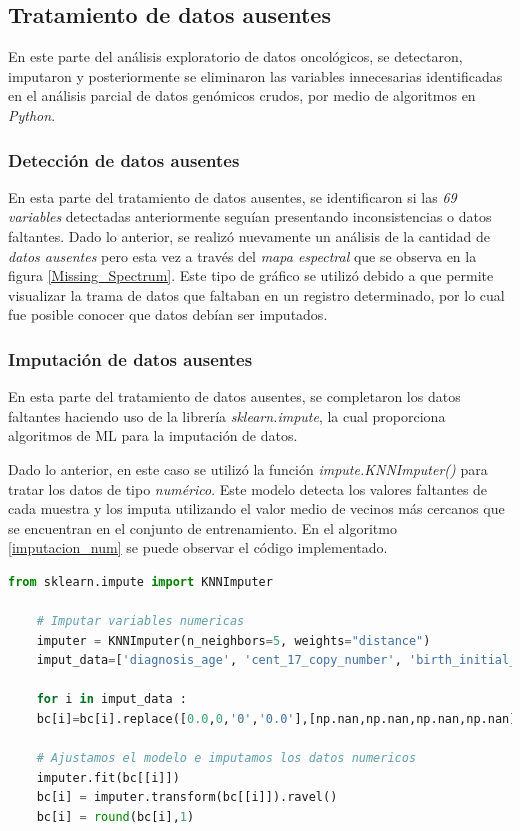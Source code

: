 \newpage
\subsection{Tratamiento de datos ausentes}
En este parte del análisis exploratorio de datos oncológicos, se detectaron, imputaron y posteriormente se eliminaron las variables innecesarias identificadas en el análisis parcial de datos genómicos crudos, por medio de algoritmos en \textit{Python}.

\subsubsection{Detección de datos ausentes}
En esta parte del tratamiento de datos ausentes, se identificaron si las \textit{69 variables} detectadas anteriormente seguían presentando inconsistencias o datos faltantes. Dado lo anterior, se realizó nuevamente un análisis de la cantidad de \textit{datos ausentes} pero esta vez a través del \textit{mapa espectral} que se observa en la figura \ref{Missing_Spectrum}. Este tipo de gráfico se utilizó debido a que permite visualizar la trama de datos que faltaban en un registro determinado, por lo cual fue posible conocer que datos debían ser imputados.

\subsubsection{Imputación de datos ausentes}
En esta parte del tratamiento de datos ausentes, se completaron los datos faltantes haciendo uso de la librería \textit{sklearn.impute}, la cual proporciona algoritmos de ML para la imputación de datos. 

Dado lo anterior, en este caso se utilizó la función \textit{impute.KNNImputer()} para tratar los datos de tipo \textit{numérico}. Este modelo detecta los valores faltantes de cada muestra y los imputa utilizando el valor medio de vecinos más cercanos que se encuentran en el conjunto de entrenamiento. En el algoritmo \ref{imputacion_num} se puede observar el código implementado.

\begin{lstlisting}[basicstyle=\scriptsize,language=Python, label=imputacion_num, caption=Imputar datos numéricos con sklearn en Python.]
	from sklearn.impute import KNNImputer
	
	# Imputar variables numericas
	imputer = KNNImputer(n_neighbors=5, weights="distance")
	imput_data=['diagnosis_age', 'cent_17_copy_number', 'birth_initial_diagnosis', 'days_sample_collection', 'her_2_cent_17_ratio', 'disease_free_months', 'days_last_followup', 'year_initial_diagnosis', 'positive_lymph_hematoxylin', 'lymph_examined_number', 'mutation_count', 'overall_survival_months', 'tmb_nonsynonymous' ]
	
	for i in imput_data :
	bc[i]=bc[i].replace([0.0,0,'0','0.0'],[np.nan,np.nan,np.nan,np.nan])
	
	# Ajustamos el modelo e imputamos los datos numericos
	imputer.fit(bc[[i]])
	bc[i] = imputer.transform(bc[[i]]).ravel()
	bc[i] = round(bc[i],1)
\end{lstlisting}

